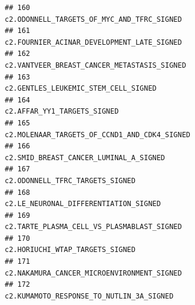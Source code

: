 \documentclass{article}\usepackage[]{graphicx}\usepackage[]{color}
\makeatletter
\newenvironment{kframe}{%
 \def\at@end@of@kframe{}%
 \ifinner\ifhmode%
  \def\at@end@of@kframe{\end{minipage}}%
  \begin{minipage}{\columnwidth}%
 \fi\fi%
 \def\FrameCommand##1{\hskip\@totalleftmargin \hskip-\fboxsep
 \colorbox{shadecolor}{##1}\hskip-\fboxsep
     \hskip-\linewidth \hskip-\@totalleftmargin \hskip\columnwidth}%
 \MakeFramed {\advance\hsize-\width
   \@totalleftmargin\z@ \linewidth\hsize
   \@setminipage}}%
 {\par\unskip\endMakeFramed%
 \at@end@of@kframe}
\newenvironment{knitrout}{}{} %
\makeatother
\begin{document}
\begin{knitrout}
\begin{kframe}
\begin{verbatim}
## 160                                                                                                                                                                       c2.ODONNELL_TARGETS_OF_MYC_AND_TFRC_SIGNED
## 161                                                                                                                                                                       c2.FOURNIER_ACINAR_DEVELOPMENT_LATE_SIGNED
## 162                                                                                                                                                                      c2.VANTVEER_BREAST_CANCER_METASTASIS_SIGNED
## 163                                                                                                                                                                             c2.GENTLES_LEUKEMIC_STEM_CELL_SIGNED
## 164                                                                                                                                                                                      c2.AFFAR_YY1_TARGETS_SIGNED
## 165                                                                                                                                                                     c2.MOLENAAR_TARGETS_OF_CCND1_AND_CDK4_SIGNED
## 166                                                                                                                                                                           c2.SMID_BREAST_CANCER_LUMINAL_A_SIGNED
## 167                                                                                                                                                                                  c2.ODONNELL_TFRC_TARGETS_SIGNED
## 168                                                                                                                                                                            c2.LE_NEURONAL_DIFFERENTIATION_SIGNED
## 169                                                                                                                                                                       c2.TARTE_PLASMA_CELL_VS_PLASMABLAST_SIGNED
## 170                                                                                                                                                                                  c2.HORIUCHI_WTAP_TARGETS_SIGNED
## 171                                                                                                                                                                       c2.NAKAMURA_CANCER_MICROENVIRONMENT_SIGNED
## 172                                                                                                                                                                         c2.KUMAMOTO_RESPONSE_TO_NUTLIN_3A_SIGNED

\end{verbatim}
\end{kframe}
\end{knitrout}
\end{document}
